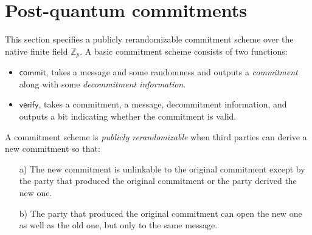 \section{Post-quantum commitments}

This section specifies a publicly rerandomizable commitment scheme over the native finite field $\mathbb{Z}_p$. A basic commitment scheme consists of two functions:
\begin{itemize}
 \item $\mathsf{commit}$, takes a message and some randomness and outputs a \emph{commitment} along with some \emph{decommitment information}.
 \item $\mathsf{verify}$, takes a commitment, a message, decommitment information, and outputs a bit indicating whether the commitment is valid.
\end{itemize}

A commitment scheme is \emph{publicly rerandomizable} when third parties can derive a new commitment so that:
\begin{itemize}
\item[a)] The new commitment is unlinkable to the original commitment except by the party that produced the original commitment or the party derived the new one.
\item[b)] The party that produced the original commitment can open the new one as well as the old one, but only to the same message.
\end{itemize}

